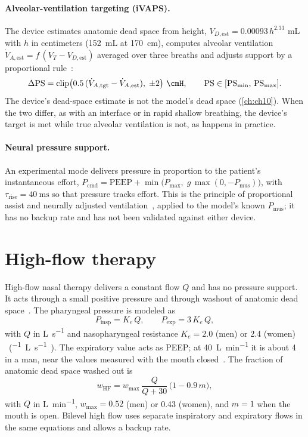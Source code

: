 \paragraph{Alveolar-ventilation targeting (iVAPS).} The device estimates anatomic dead space from height, $V_{D,\mathrm{est}} = 0.00093\,h^{2.33}$ \si{\milli\liter} with $h$ in centimeters (\SI{152}{\milli\liter} at \SI{170}{\centi\meter}), computes alveolar ventilation $\dot V_{A,\mathrm{est}} = f\,(V_T - V_{D,\mathrm{est}})$ averaged over three breaths and adjusts support by a proportional rule~\citep{kelly2014}:
\begin{equation}
\Delta\mathrm{PS} = \mathrm{clip}\bigl(0.5\,(\dot V_{A,\mathrm{tgt}} - \dot V_{A,\mathrm{est}}),\;\pm 2\bigr)\ \si{\cmH},\qquad
\mathrm{PS} \in [\mathrm{PS_{min}},\,\mathrm{PS_{max}}].
\label{eq:modes-ivaps}
\end{equation}
The device's dead-space estimate is not the model's dead space (\cref{ch:ch10}). When the two differ, as with an interface or in rapid shallow breathing, the device's target is met while true alveolar ventilation is not, as happens in practice.

\paragraph{Neural pressure support.} An experimental mode delivers pressure in proportion to the patient's instantaneous effort, $P_{\mathrm{cmd}} = \mathrm{PEEP} + \min\bigl(P_{\max},\;g\,\max(0,-P_{\mathrm{mus}})\bigr)$, with $\tau_{\mathrm{rise}} = \SI{40}{\milli\second}$ so that pressure tracks effort. This is the principle of proportional assist and neurally adjusted ventilation~\citep{younes1992,sinderby1999}, applied to the model's known $P_{\mathrm{mus}}$; it has no backup rate and has not been validated against either device.

\section{High-flow therapy}
\label{sec:modes-hf}
High-flow nasal therapy delivers a constant flow $Q$ and has no pressure support. It acts through a small positive pressure and through washout of anatomic dead space~\citep{parke2009,moller2015}. The pharyngeal pressure is modeled as
\begin{equation}
P_{\mathrm{insp}} = K_e\,Q,\qquad P_{\mathrm{exp}} = 3\,K_e\,Q,
\label{eq:modes-hf}
\end{equation}
with $Q$ in \si{\liter\per\second} and nasopharyngeal resistance $K_e = 2.0$ (men) or 2.4 (women) \si{\cmH\per(\liter\per\second)}. The expiratory value acts as PEEP; at \SI{40}{\liter\per\minute} it is about \SI{4}{\cmH} in a man, near the values measured with the mouth closed~\citep{parke2009}. The fraction of anatomic dead space washed out is
\begin{equation}
w_{\mathrm{HF}} = w_{\max}\,\frac{Q}{Q + 30}\,\bigl(1 - 0.9\,m\bigr),
\label{eq:modes-hfw}
\end{equation}
with $Q$ in \si{\liter\per\minute}, $w_{\max} = 0.52$ (men) or 0.43 (women), and $m = 1$ when the mouth is open. Bilevel high flow uses separate inspiratory and expiratory flows in the same equations and allows a backup rate.

